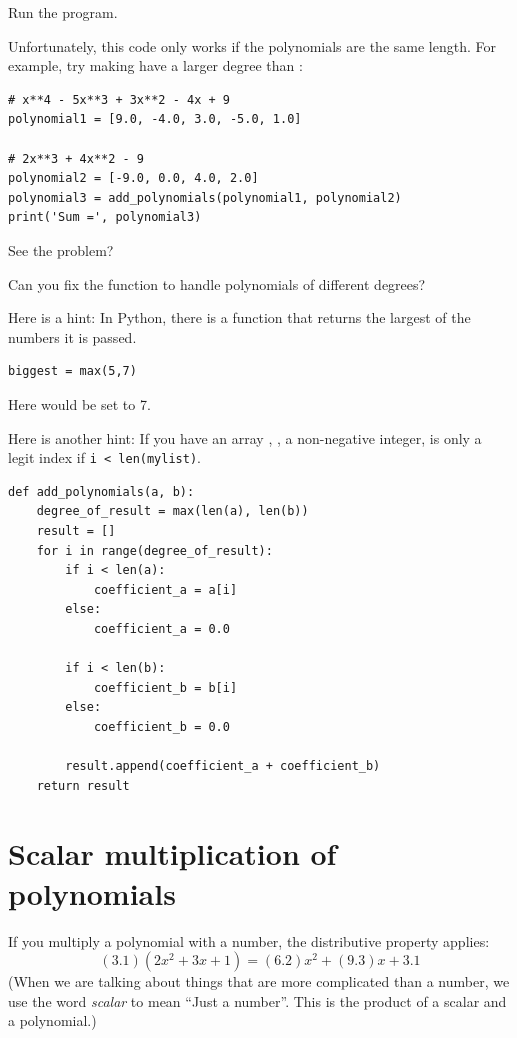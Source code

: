 Run the program.

Unfortunately, this code only works if the polynomials are the same length. For
example, try making  have a larger degree than
:
\begin{verbatim}
# x**4 - 5x**3 + 3x**2 - 4x + 9
polynomial1 = [9.0, -4.0, 3.0, -5.0, 1.0]
  
# 2x**3 + 4x**2 - 9  
polynomial2 = [-9.0, 0.0, 4.0, 2.0]
polynomial3 = add_polynomials(polynomial1, polynomial2)
print('Sum =', polynomial3)
\end{verbatim}

See the problem?

\begin{Exercise}[title=Dealing with polynomials of different degrees, label=pyaddpolys]
  
Can you fix the function  to handle polynomials of different degrees?

Here is a hint: In Python, there is a  function that returns the largest of the numbers it is passed.
\begin{verbatim}
biggest = max(5,7)
\end{verbatim}
Here  would be set to 7.

Here is another hint: If you have an array , ,
a non-negative integer, is only a legit index if \texttt{i <
  len(mylist)}.
\end{Exercise}
\begin{Answer}[ref=pyaddpolys]
\begin{verbatim}
def add_polynomials(a, b):
    degree_of_result = max(len(a), len(b))
    result = []
    for i in range(degree_of_result):
        if i < len(a):
            coefficient_a = a[i]
        else:
            coefficient_a = 0.0   

        if i < len(b):
            coefficient_b = b[i]
        else:
            coefficient_b = 0.0
            
        result.append(coefficient_a + coefficient_b)
    return result
\end{verbatim}
\end{Answer}

\section{Scalar multiplication of  polynomials}

If you multiply a polynomial with a number, the distributive property applies:
\begin{equation*}
  (3.1)(2x^2 + 3x + 1) = (6.2)x^2 + (9.3)x + 3.1
\end{equation*}
(When we are talking about things that are more complicated than a number, we use the word \emph{scalar} to mean ``Just a number''. This is the product of a scalar and a polynomial.)

